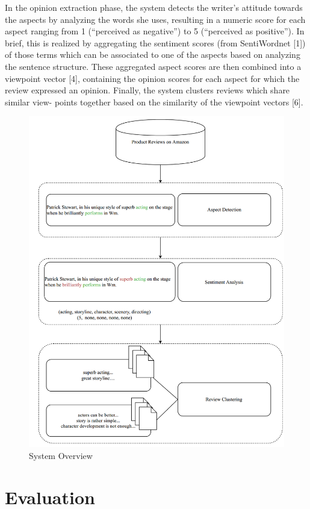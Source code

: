 \documentclass[runningheads,a4paper]{llncs}
\makeatletter
\def\maxwidth#1{\ifdim\Gin@nat@width>#1 #1\else\Gin@nat@width\fi}
\makeatother
\begin{document}
In the opinion extraction phase, the system detects the writer's attitude towards the aspects by analyzing the words she uses, resulting in a numeric score for each aspect ranging from 1 (``perceived as negative'') to 5 (``perceived as positive''). In brief, this is realized by aggregating the sentiment scores (from SentiWordnet [1]) of those terms which can be associated to one of the aspects based on analyzing the sentence structure. These aggregated aspect scores are then combined into a viewpoint vector [4], containing the opinion scores for each aspect for which the review expressed an opinion. Finally, the system clusters reviews which share similar view- points together based on the similarity of the viewpoint vectors [6].
\begin{figure}[h!]
\centering
\includegraphics[width=\maxwidth{\textwidth}]{./img/image1.png}
\cprotect\caption{ System Overview}
\label{_Ref490292540}
\end{figure}


\section{Evaluation}
\end{document}
